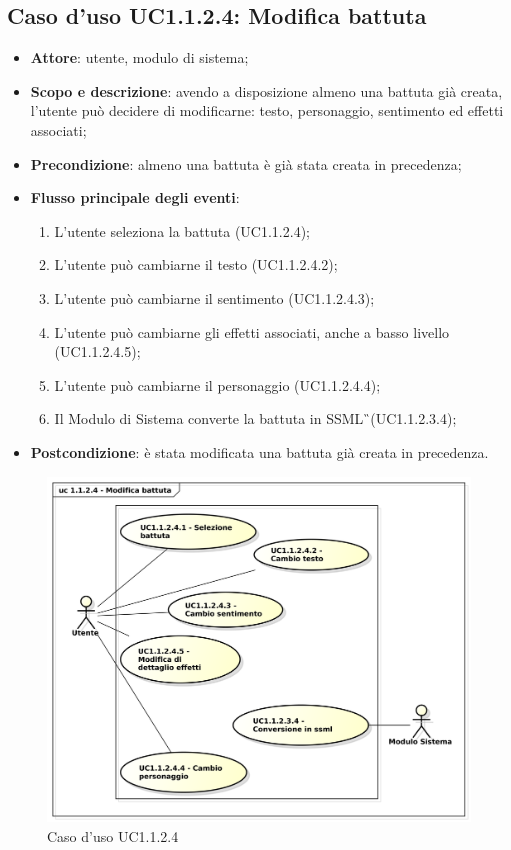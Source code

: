 \subsection{Caso d'uso UC1.1.2.4: Modifica battuta}
\label{sec:UC1.1.2.4}

\begin{itemize}
\item \textbf{Attore}: utente, modulo di sistema;
\item \textbf{Scopo e descrizione}: avendo a disposizione almeno una battuta già creata, l'utente può decidere di modificarne: testo, personaggio, sentimento ed effetti associati;
\item \textbf{Precondizione}: almeno una battuta è già stata creata in precedenza;
\item \textbf{Flusso principale degli eventi}:
\begin{enumerate}
\item L'utente seleziona la battuta (UC1.1.2.4);
\item L'utente può cambiarne il testo (UC1.1.2.4.2);
\item L'utente può cambiarne il sentimento (UC1.1.2.4.3);
\item L'utente può cambiarne gli effetti associati, anche a basso livello (UC1.1.2.4.5);
\item L'utente può cambiarne il personaggio (UC1.1.2.4.4);
\item Il Modulo di Sistema converte la battuta in SSML\G\ (UC1.1.2.3.4);
\end{enumerate}
\item \textbf{Postcondizione}: è stata modificata una battuta già creata in precedenza.
\end{itemize}
\begin{figure}[htbp]
\centering
\includegraphics[scale=0.5]{immagini/uc1_1_2_4_modifica_battuta.png}
\captionsetup{labelfont=bf}
\caption{Caso d'uso UC1.1.2.4}
\end{figure}
\newpage

